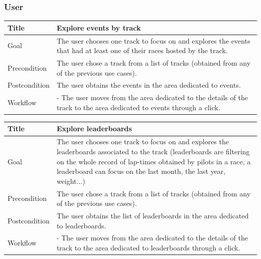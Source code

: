 \documentclass{beamer}
\begin{document}
\begin{frame}
    \frametitle{User}
    \begin{table}
        \tiny
        \begin{tabular}{|p{2cm}|p{6cm}|}
        \hline
        Title & \textbf{Explore events by track} \\
        \hline
        Goal & The user chooses one track to focus on and explores the events that had at least one
        of their races hosted by the track. \\
        \hline
        Precondition & The user chose a track from a list of tracks (obtained from any of the previous use cases).\\
        \hline
        Postcondition & The user obtains the events in the area dedicated to events. \\
        \hline
        Workflow &
        - The user moves from the area dedicated to the details of the track to the
        area dedicated to events through a click. \\
        \hline
        \end{tabular}
\end{table}

\begin{table}
    \tiny
    \begin{tabular}{|p{2cm}|p{6cm}|}
    \hline
    Title & \textbf{Explore leaderboards} \\
    \hline
    Goal & The user chooses one track to focus on and explores the leaderboards associated
    to the track (leaderboards are filtering on the whole record of lap-times obtained by pilots in a race,
    a leaderboard can focus on the last month, the last year, weight...) \\
    \hline
    Precondition & The user chose a track from a list of tracks (obtained from any of the previous use cases).\\
    \hline
    Postcondition & The user obtains the list of leaderboards in the area dedicated to leaderboards. \\
    \hline
    Workflow &
    - The user moves from the area dedicated to the details of the track to the
    area dedicated to leaderboards through a click. \\
    \hline
    \end{tabular}
\end{table}
\end{frame}

\end{document}
